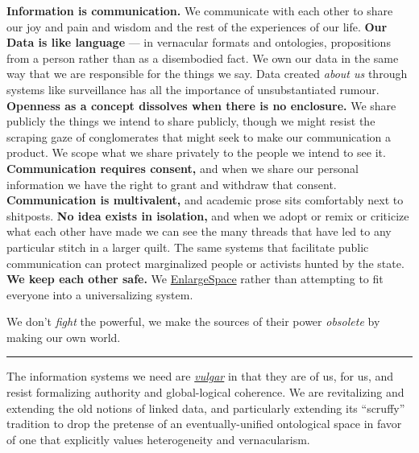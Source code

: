 \textbf{Information is communication.} We communicate with each other to
share our joy and pain and wisdom and the rest of the experiences of our
life. \textbf{Our Data is like language} --- in vernacular formats and
ontologies, propositions from a person rather than as a disembodied
fact. We own our data in the same way that we are responsible for the
things we say. Data created \emph{about us} through systems like
surveillance has all the importance of unsubstantiated rumour.
\textbf{Openness as a concept dissolves when there is no enclosure.} We
share publicly the things we intend to share publicly, though we might
resist the scraping gaze of conglomerates that might seek to make our
communication a product. We scope what we share privately to the people
we intend to see it. \textbf{Communication requires consent,} and when
we share our personal information we have the right to grant and
withdraw that consent. \textbf{Communication is multivalent,} and
academic prose sits comfortably next to shitposts. \textbf{No idea
exists in isolation,} and when we adopt or remix or criticize what each
other have made we can see the many threads that have led to any
particular stitch in a larger quilt. The same systems that facilitate
public communication can protect marginalized people or activists hunted
by the state. \textbf{We keep each other safe.} We
\href{http://meatballwiki.org/wiki/EnlargeSpace}{EnlargeSpace} \cite{MeatballWikiEnlargeSpace}  rather than attempting to fit everyone
into a universalizing system.

We don't \emph{fight} the powerful, we make the sources of their power
\emph{obsolete} by making our own world.

\begin{center}\rule{0.5\linewidth}{0.5pt}\end{center}

The information systems we need are
\href{https://www.etymonline.com/search?q=vulgar}{\emph{vulgar}} \cite{harperVulgar}  in that they are of us, for us, and resist
formalizing authority and global-logical coherence. We are revitalizing
and extending the old notions of linked data, and particularly extending
its ``scruffy'' tradition \cite{poirierTurnScruffyEthnographic2017}  to drop the pretense of an eventually-unified ontological space in
favor of one that explicitly values heterogeneity and vernacularism.

